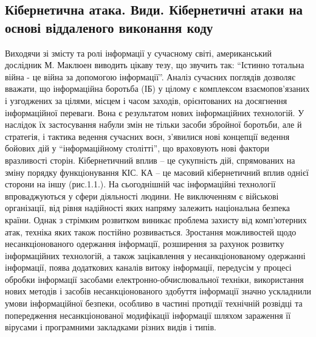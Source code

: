 \documentclass[oneside,final,14pt]{extreport}
\begin{document}
\subsection{Кібернетична атака. Види. Кібернетичні атаки на основі віддаленого виконання коду}
\label{1section:id2}
Виходячи зі змісту та ролі інформації у сучасному світі, американський дослідник М. Маклюен виводить цікаву тезу, що звучить так: ``Істинно тотальна війна - це війна за допомогою інформації''.
Аналіз сучасних поглядів дозволяє вважати, що інформаційна боротьба (ІБ) у цілому є комплексом взаємопов'язаних і узгоджених за цілями, місцем і часом заходів, орієнтованих на досягнення інформаційної переваги. Вона є результатом нових інформаційних технологій. У наслідок їх застосування набули змін не тільки засоби збройної боротьби, але й стратегія, і тактика ведення сучасних воєн, з'явилися нові концепції ведення бойових дій у ``інформаційному столітті'', що враховують нові фактори вразливості сторін.
Кібернетичний вплив – це сукупність дій, спрямованих на зміну порядку функціонування КІС. КА – це  масовий кібернетичний вплив однієї сторони на іншу (рис.1.1.).
На сьогоднішній час інформаційні технології впроваджуються у сфери  діяльності людини. Не виключенням є військові організації, від рівня надійності яких напряму залежить національна безпека країни. Однак з стрімким розвитком виникає проблема захисту від комп'ютерних атак, техніка яких також постійно розвивається.
Зростання можливостей щодо несанкціонованого одержання інформації, розширення за рахунок розвитку інформаційних технологій,  а також зацікавлення у несанкціонованому одержанні інформації, поява додаткових каналів витоку інформації, передусім у процесі обробки інформації засобами електронно-обчислювальної техніки, використання нових методів і засобів несанкціонованого здобуття інформації значно ускладнили умови інформаційної безпеки, особливо в частині протидії технічній розвідці та попередження несанкціонованої модифікації інформації  шляхом зараження її вірусами і програмними  закладками різних видів і типів.
\end{document}
